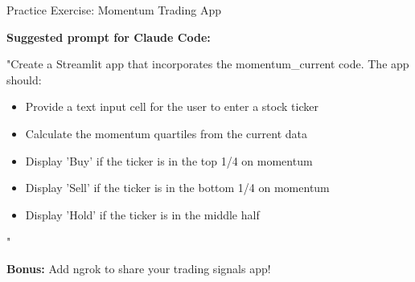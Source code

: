 \documentclass[aspectratio=169]{beamer}
\begin{document}
\begin{frame}{Practice Exercise: Momentum Trading App}

\textbf{Suggested prompt for Claude Code:}

\vspace{1em}

\small
"Create a Streamlit app that incorporates the momentum\_current code. The app should:
\begin{itemize}
    \item Provide a text input cell for the user to enter a stock ticker
    \item Calculate the momentum quartiles from the current data
    \item Display 'Buy' if the ticker is in the top 1/4 on momentum
    \item Display 'Sell' if the ticker is in the bottom 1/4 on momentum
    \item Display 'Hold' if the ticker is in the middle half
\end{itemize}"

\vspace{0.5em}

\normalsize
\textbf{Bonus:} Add ngrok to share your trading signals app!

\end{frame}
\end{document}
